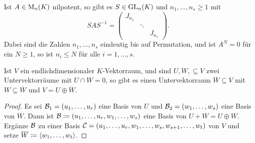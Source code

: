 \begin{corollary}
  Ist $A \in \mathrm{M}_n(K)$ nilpotent, so gibt es $S \in \mathrm{GL}_n(K)$ und $n_1, \dotsc, n_s \geq 1$ mit
  \[
    S A S^{-1}
    =
    \begin{pmatrix}
      J_{n_1} &         &         \\
              & \ddots  &         \\
              &         & J_{n_s}
    \end{pmatrix}.
  \]
  Dabei sind die Zahlen $n_1, \dotsc, n_s$ eindeutig bis auf Permutation, und ist $A^N = 0$ für ein $N \geq 1$, so ist $n_i \leq N$ für alle $i = 1, \dotsc, s$.
\end{corollary}


\begin{lemma}\label{lem: extensions to directs summands}
  Ist $V$ ein endlichdimensionaler $K$-Vektorraum, und sind $U, W, \subseteq V$ zwei Untervektorräume mit $U \cap W = 0$, so gibt es einen Untervektorraum $\overline{W} \subseteq V$ mit $W \subseteq \overline{W}$ und $V = U \oplus \overline{W}$.
\end{lemma}
\begin{proof}
  Es sei $\mathcal{B}_1 = (u_1, \dotsc, u_r)$ eine Basis von $U$ und $\mathcal{B}_2 = (w_1, \dotsc, w_s)$ eine Basis von $W$.
  Dann ist $\mathcal{B} \coloneqq (u_1, \dotsc, u_r, w_1, \dotsc, w_s)$ eine Basis von $U + W = U \oplus W$.
  Ergänze $\mathcal{B}$ zu einer Basis $\mathcal{C} = (u_1, \dotsc, u_r, w_1, \dotsc, w_s, w_{s+1}, \dotsc, w_t)$ von $V$ und setze $\overline{W} \coloneqq \left\langle w_1, \dotsc, w_t \right\rangle$.
\end{proof}


